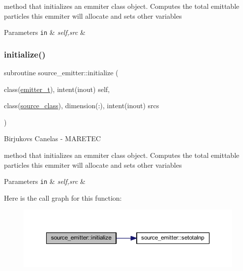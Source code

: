method that initializes an emmiter class object. Computes the total emittable particles this emmiter will allocate and sets other variables 
\begin{DoxyParams}[1]{Parameters}
\mbox{\tt in}  & {\em self,src} & \\
\hline
\end{DoxyParams}
\mbox{\label{namespacesource__emitter_a6400b97541c15fcf0ec523b359aacac9}} 
\subsubsection{\texorpdfstring{initialize()}{initialize()}}
{\footnotesize\ttfamily subroutine source\+\_\+emitter\+::initialize (\begin{DoxyParamCaption}\item[{class(\hyperlink{structsource__emitter_1_1emitter__t}{emitter\+\_\+t}), intent(inout)}]{self,  }\item[{class(\hyperlink{structsource__identity_1_1source__class}{source\+\_\+class}), dimension(\+:), intent(inout)}]{srcs }\end{DoxyParamCaption})\hspace{0.3cm}{\ttfamily [private]}}



Birjukovs Canelas -\/ M\+A\+R\+E\+T\+EC 

method that initializes an emmiter class object. Computes the total emittable particles this emmiter will allocate and sets other variables 
\begin{DoxyParams}[1]{Parameters}
\mbox{\tt in}  & {\em self,src} & \\
\hline
\end{DoxyParams}
Here is the call graph for this function\+:\nopagebreak
\begin{figure}[H]
\begin{center}
\leavevmode
\includegraphics[width=350pt]{namespacesource__emitter_a6400b97541c15fcf0ec523b359aacac9_cgraph}
\end{center}
\end{figure}
\mbox{\label{namespacesource__emitter_a2fb64d19c0016b31bd9dab0a13785d61}} 
